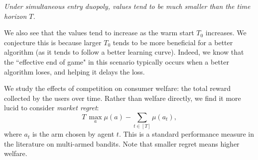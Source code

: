 \documentclass[../competing_bandits_with_appendix.tex]{subfiles}
\begin{document}
\begin{finding}
\textit{
Under simultaneous entry duopoly, \Eeog values tend to be much smaller than the time horizon $T$.
}
\end{finding}

We also see that the \Eeog values tend to increase as the warm start $T_0$ increases. We conjecture this is because larger $T_0$ tends to be more beneficial for a better algorithm (as it tends to follow a better learning curve). Indeed, we know that the ``effective end of game" in this scenario typically occurs when a better algorithm loses, and helping it delays the loss.


We study the effects of competition on consumer welfare: the total reward collected by the users over time. Rather than welfare directly, we find it more lucid to consider
\emph{market regret}:
\[ \textstyle T\, \max_a \mu(a) - \sum_{t\in [T]} \mu(a_t), \]
where $a_t$ is the arm chosen by agent $t$. This is a standard performance measure in the literature on multi-armed bandits. Note that smaller regret means higher welfare.
\end{document}
